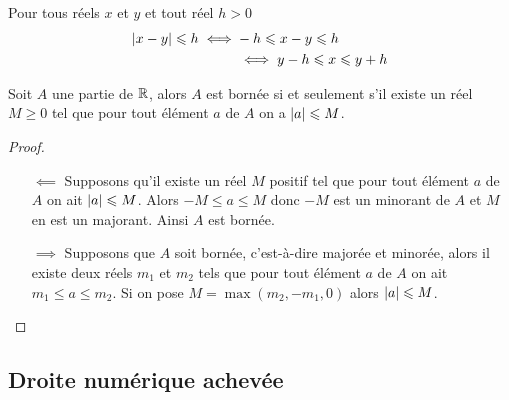\begin{prop}
  Pour tous réels \(x\) et \(y\) et tout réel \(h>0\)
  \begin{align}
    \left\lvert x-y\right\rvert\leqslant h \iff & -h \leqslant x-y \leqslant h\\
    &\iff y-h \leqslant x \leqslant y+h
  \end{align}
\end{prop}
\begin{prop}
  Soit \(A\) une partie de \(\mathbb{R}\), alors \(A\) est bornée si et seulement s'il existe un réel \(M\geqslant 0\) tel que pour tout élément \(a\) de \(A\) on a \(\left\lvert a\right\rvert\leqslant M\).
\end{prop}
\begin{proof}
  \begin{itemize}
  \item[\(\impliedby\)] Supposons qu'il existe un réel \(M\) positif tel que pour tout élément \(a\) de \(A\) on ait \(\left\lvert a\right\rvert\leqslant M\). Alors \(-M\leqslant a\leqslant M\) donc \(-M\) est un minorant de \(A\) et \(M\) en est un majorant. Ainsi \(A\) est bornée.
  \item[\(\implies\)] Supposons que \(A\) soit bornée, c'est-à-dire majorée et minorée, alors il existe deux réels \(m_1\) et \(m_2\) tels que pour tout élément \(a\) de \(A\) on ait \(m_1\leqslant a\leqslant m_2\). Si on pose \(M=\max(m_2,-m_1,0)\) alors \(\left\lvert a\right\rvert\leqslant M\).
  \end{itemize}
\end{proof}

\subsection{Droite numérique achevée}

